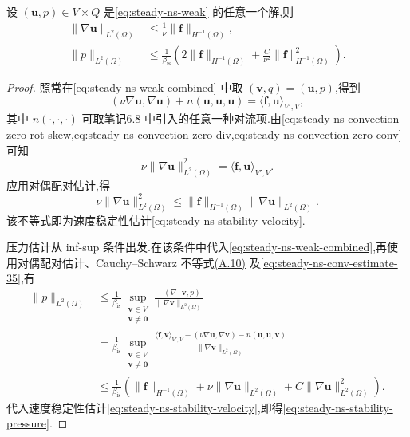 \begin{lemma}[解的稳定性]\label{lem:steady-ns-stability}
设 $(\bm{u},p)\in V\times Q$ 是\cref{eq:steady-ns-weak} 的任意一个解,则
\begin{align}
  \|\nabla\bm{u}\|_{L^2(\Omega)}
    &\le\frac1\nu\|\bm{f}\|_{H^{-1}(\Omega)},
       \label{eq:steady-ns-stability-velocity}\\
  \|p\|_{L^2(\Omega)}
    &\le\frac1{\beta_{\mathrm{is}}}
       \left(2\|\bm{f}\|_{H^{-1}(\Omega)}
             +\frac{C}{\nu^2}\|\bm{f}\|_{H^{-1}(\Omega)}^2\right).
       \label{eq:steady-ns-stability-pressure}
\end{align}
\end{lemma}

\begin{proof}
照常在\cref{eq:steady-ns-weak-combined} 中取 $(\bm{v},q)=(\bm{u},p)$,得到
\[
  (\nu\nabla\bm{u},\nabla\bm{u})
    +n(\bm{u},\bm{u},\bm{u})
       =\langle\bm{f},\bm{u}\rangle_{V',V},
\]
其中 $n(\cdot,\cdot,\cdot)$ 可取笔记\hyperref[note:steady-ns-equivalent-variational-forms]{6.8} 中引入的任意一种对流项.由\cref{eq:steady-ns-convection-zero-rot-skew,eq:steady-ns-convection-zero-div,eq:steady-ns-convection-zero-conv} 可知
\[
  \nu\|\nabla\bm{u}\|_{L^2(\Omega)}^2
    =\langle\bm{f},\bm{u}\rangle_{V',V}.
\]
应用对偶配对估计,得
\[
  \nu\|\nabla\bm{u}\|_{L^2(\Omega)}^2
    \le\|\bm{f}\|_{H^{-1}(\Omega)}
       \|\nabla\bm{u}\|_{L^2(\Omega)}.
\]
该不等式即为速度稳定性估计\cref{eq:steady-ns-stability-velocity}.

压力估计从 inf-sup 条件出发.在该条件中代入\cref{eq:steady-ns-weak-combined},再使用对偶配对估计、Cauchy--Schwarz 不等式\hyperref[eq:appendix-a-10]{(A.10)} 及\cref{eq:steady-ns-conv-estimate-35},有
\[
\begin{aligned}
  \|p\|_{L^2(\Omega)}
   &\le\frac1{\beta_{\mathrm{is}}}
       \sup_{\substack{\bm{v}\in V\\\bm{v}\ne\bm{0}}}
       \frac{-(\nabla\cdot\bm{v},p)}
            {\|\nabla\bm{v}\|_{L^2(\Omega)}}\\
   &=\frac1{\beta_{\mathrm{is}}}
       \sup_{\substack{\bm{v}\in V\\\bm{v}\ne\bm{0}}}
       \frac{\langle\bm{f},\bm{v}\rangle_{V',V}
             -(\nu\nabla\bm{u},\nabla\bm{v})
             -n(\bm{u},\bm{u},\bm{v})}
            {\|\nabla\bm{v}\|_{L^2(\Omega)}}\\
   &\le\frac1{\beta_{\mathrm{is}}}
       \left(\|\bm{f}\|_{H^{-1}(\Omega)}
             +\nu\|\nabla\bm{u}\|_{L^2(\Omega)}
             +C\|\nabla\bm{u}\|_{L^2(\Omega)}^2\right).
\end{aligned}
\]
代入速度稳定性估计\cref{eq:steady-ns-stability-velocity},即得\cref{eq:steady-ns-stability-pressure}.
\end{proof}


